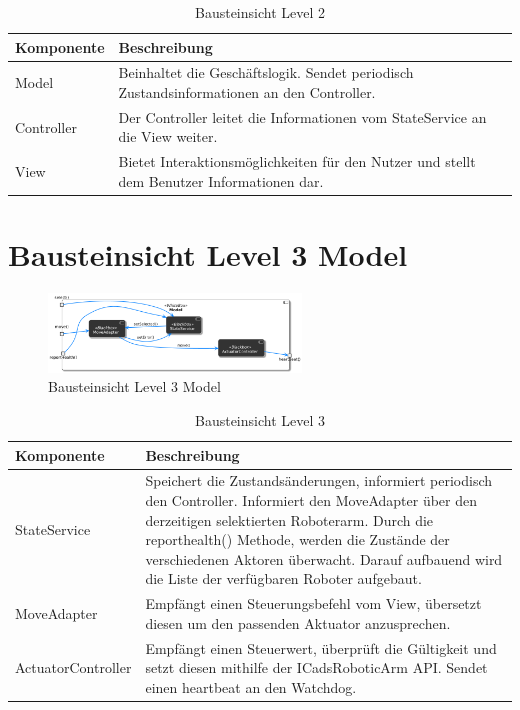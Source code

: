 \begin{table}[h!]
\centering
\begin{tabular}{|p{4cm}|p{9cm}|}
\hline
\textbf{Komponente} & \textbf{Beschreibung} \\ \hline
Model & Beinhaltet die Geschäftslogik. Sendet periodisch Zustandsinformationen an den Controller. \\ \hline
Controller &  Der Controller leitet die Informationen vom StateService an die View weiter. \\ \hline
View & Bietet Interaktionsmöglichkeiten für den Nutzer und stellt dem Benutzer Informationen dar. 
\end{tabular}
\caption{Bausteinsicht Level 2}
\label{tab:lvl2}
\end{table}
\newpage

\section{Bausteinsicht Level 3 Model}
\begin{figure}[h] %
    \centering
    \includegraphics[width=0.6\textwidth]{diagrams/baustein_lvl_3_model_updated.png}
    \caption{Bausteinsicht Level 3 Model}
\end{figure}

\begin{table}[h!]
\centering
\begin{tabular}{|p{4cm}|p{9cm}|}
\hline
\textbf{Komponente} & \textbf{Beschreibung} \\ \hline
StateService & Speichert die Zustandsänderungen, informiert periodisch den Controller. 
Informiert den MoveAdapter über den derzeitigen selektierten Roboterarm. Durch die reporthealth() Methode, werden die Zustände der verschiedenen Aktoren überwacht. Darauf aufbauend wird die Liste der verfügbaren Roboter aufgebaut.\\ \hline
MoveAdapter  & Empfängt einen Steuerungsbefehl vom View, übersetzt diesen um den passenden Aktuator anzusprechen. \\ \hline
ActuatorController & Empfängt einen Steuerwert, überprüft die Gültigkeit und setzt diesen mithilfe der ICadsRoboticArm API. Sendet einen heartbeat an den Watchdog. \\ \hline
\end{tabular}
\caption{Bausteinsicht Level 3}
\label{tab:lvl3}
\end{table}


